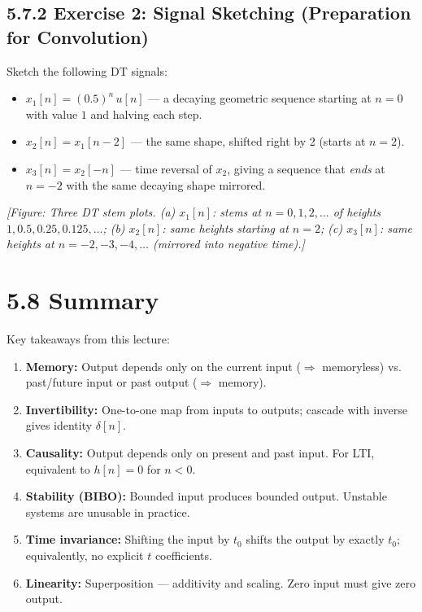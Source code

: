 \documentclass[11pt]{article}
\begin{document}
\subsection*{5.7.2 Exercise 2: Signal Sketching (Preparation for Convolution)}

Sketch the following DT signals:

\begin{itemize}
  \item $x_1[n] = (0.5)^n\,u[n]$ — a decaying geometric sequence starting at $n=0$ with value $1$ and halving each step.
  \item $x_2[n] = x_1[n-2]$ — the same shape, shifted right by 2 (starts at $n=2$).
  \item $x_3[n] = x_2[-n]$ — time reversal of $x_2$, giving a sequence that \textit{ends} at $n = -2$ with the same decaying shape mirrored.
\end{itemize}

\textit{[Figure: Three DT stem plots. (a) $x_1[n]$: stems at $n=0,1,2,\ldots$ of heights $1, 0.5, 0.25, 0.125, \ldots$; (b) $x_2[n]$: same heights starting at $n=2$; (c) $x_3[n]$: same heights at $n=-2, -3, -4, \ldots$ (mirrored into negative time).]}

\section*{5.8 Summary}

Key takeaways from this lecture:

\begin{enumerate}
  \item \textbf{Memory:} Output depends only on the current input ($\Rightarrow$ memoryless) vs. past/future input or past output ($\Rightarrow$ memory).
  \item \textbf{Invertibility:} One-to-one map from inputs to outputs; cascade with inverse gives identity $\delta[n]$.
  \item \textbf{Causality:} Output depends only on present and past input. For LTI, equivalent to $h[n] = 0$ for $n<0$.
  \item \textbf{Stability (BIBO):} Bounded input produces bounded output. Unstable systems are unusable in practice.
  \item \textbf{Time invariance:} Shifting the input by $t_0$ shifts the output by exactly $t_0$; equivalently, no explicit $t$ coefficients.
  \item \textbf{Linearity:} Superposition — additivity and scaling. Zero input must give zero output.
\end{enumerate}
\end{document}

